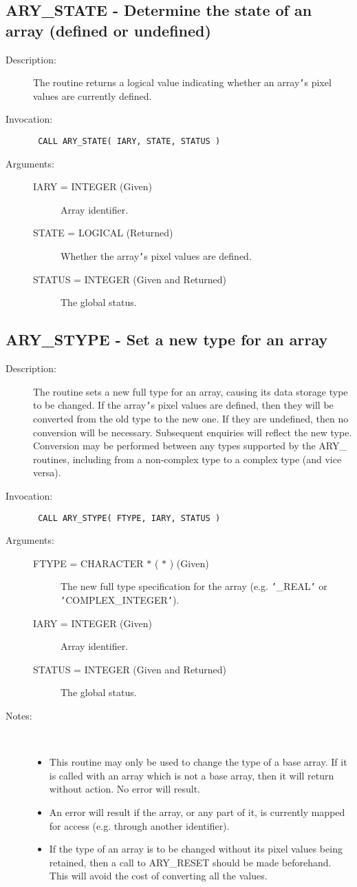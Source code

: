 \documentclass[twoside,11pt]{article}
\newcommand{\xlabel}[1]{}
\newlength{\sstbannerlength}
\newlength{\sstcaptionlength}
\newlength{\sstexampleslength}
\newlength{\sstexampleswidth}
\newcommand{\sstroutine}[3]{
   \goodbreak
   \rule{\textwidth}{0.5mm}
   \vspace{-7ex}
   \newline
   \settowidth{\sstbannerlength}{{\Large {\bf #1}}}
   \setlength{\sstcaptionlength}{\textwidth}
   \setlength{\sstexampleslength}{\textwidth}
   \addtolength{\sstbannerlength}{0.5em}
   \addtolength{\sstcaptionlength}{-2.0\sstbannerlength}
   \addtolength{\sstcaptionlength}{-5.0pt}
   \settowidth{\sstexampleswidth}{{\bf Examples:}}
   \addtolength{\sstexampleslength}{-\sstexampleswidth}
   \parbox[t]{\sstbannerlength}{\flushleft{\Large {\bf #1}}}
   \parbox[t]{\sstcaptionlength}{\center{\Large #2}}
   \parbox[t]{\sstbannerlength}{\flushright{\Large {\bf #1}}}
   \begin{description}
      #3
   \end{description}
}
\newcommand{\sstdescription}[1]{\item[Description:] #1}
\newcommand{\sstinvocation}[1]{\item[Invocation:]\hspace{0.4em}{\tt #1}}
\newcommand{\sstarguments}[1]{
   \item[Arguments:] \mbox{} \\
   \vspace{-3.5ex}
   \begin{description}
      #1
   \end{description}
}
\newcommand{\sstsubsection}[1]{ \item[{#1}] \mbox{} \\}
\newcommand{\sstnotes}[1]{\item[Notes:] \mbox{} \\[1.3ex] #1}
\newcommand{\sstitemlist}[1]{
  \mbox{} \\
  \vspace{-3.5ex}
  \begin{itemize}
     #1
  \end{itemize}
}
\newcommand{\sstitem}{\item}
\newcommand{\ssttt}{\tt}
\renewcommand{\sstroutine}[3]{
      \subsection{#1\xlabel{#1}-\label{#1}#2}
      \begin{description}
         #3
      \end{description}
   }
\renewcommand{\sstdescription}[1]{\item[Description:]
      \begin{description}
         #1
      \end{description}
   }
\renewcommand{\sstinvocation}[1]{\item[Invocation:]
      \begin{description}
         {\ssttt #1}
      \end{description}
   }
\renewcommand{\sstarguments}[1]{
      \item[Arguments:]
      \begin{description}
         #1
      \end{description}
   }
\renewcommand{\sstsubsection}[1]{\item[{#1}]}
\renewcommand{\sstnotes}[1]{\item[Notes:]
      \begin{description}
         #1
      \end{description}
   }
\newcommand{\sstitemlist}[1]{
      \begin{itemize}
         #1
      \end{itemize}
   }
\begin{document}
\sstroutine{
   ARY\_STATE
}{
   Determine the state of an array (defined or undefined)
}{
   \sstdescription{
      The routine returns a logical value indicating whether an array{\tt '}s
      pixel values are currently defined.
   }
   \sstinvocation{
      CALL ARY\_STATE( IARY, STATE, STATUS )
   }
   \sstarguments{
      \sstsubsection{
         IARY = INTEGER (Given)
      }{
         Array identifier.
      }
      \sstsubsection{
         STATE = LOGICAL (Returned)
      }{
         Whether the array{\tt '}s pixel values are defined.
      }
      \sstsubsection{
         STATUS = INTEGER (Given and Returned)
      }{
         The global status.
      }
   }
}
\sstroutine{
   ARY\_STYPE
}{
   Set a new type for an array
}{
   \sstdescription{
      The routine sets a new full type for an array, causing its data
      storage type to be changed. If the array{\tt '}s pixel values are
      defined, then they will be converted from the old type to the new
      one.  If they are undefined, then no conversion will be
      necessary.  Subsequent enquiries will reflect the new type.
      Conversion may be performed between any types supported by the
      ARY\_ routines, including from a non-complex type to a complex
      type (and vice versa).
   }
   \sstinvocation{
      CALL ARY\_STYPE( FTYPE, IARY, STATUS )
   }
   \sstarguments{
      \sstsubsection{
         FTYPE = CHARACTER $*$ ( $*$ ) (Given)
      }{
         The new full type specification for the array (e.g.  {\tt '}\_REAL{\tt '}
         or {\tt '}COMPLEX\_INTEGER{\tt '}).
      }
      \sstsubsection{
         IARY = INTEGER (Given)
      }{
         Array identifier.
      }
      \sstsubsection{
         STATUS = INTEGER (Given and Returned)
      }{
         The global status.
      }
   }
   \sstnotes{
      \sstitemlist{

         \sstitem
         This routine may only be used to change the type of a base
         array. If it is called with an array which is not a base array,
         then it will return without action. No error will result.

         \sstitem
         An error will result if the array, or any part of it, is
         currently mapped for access (e.g. through another identifier).

         \sstitem
         If the type of an array is to be changed without its pixel
         values being retained, then a call to ARY\_RESET should be made
         beforehand. This will avoid the cost of converting all the
         values.
      }
   }
}
\end{document}
